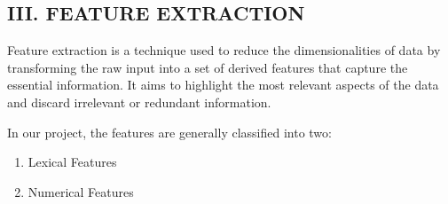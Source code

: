 \documentclass[conference]{IEEEtran}
\begin{document}
\subsection*{III. {\footnotesize FEATURE EXTRACTION}}
\par Feature extraction is a technique used to reduce the dimensionalities of data by transforming the raw input into a set of derived features that capture the essential information. It aims to highlight the most relevant aspects of the data and discard irrelevant or redundant information. 
\par In our project, the features are generally classified into two:
\begin{enumerate}
  \item Lexical Features
  \item Numerical Features
\end{enumerate}
\end{document}
